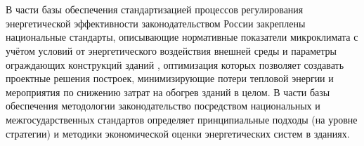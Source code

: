 \section{}


% 


\subsection{\scAssesmentBuildingLaw}
% 
В части базы обеспечения стандартизацией процессов регулирования энергетической эффективности законодательством России закреплены национальные стандарты,
описывающие нормативные показатели микроклимата \cite{law_RU_RulesCode_BuildingMicroclimateResedentialPublic} с учётом условий от энергетического воздействия внешней среды \cite{law_RU_RulesCode_BuildingClimatology}
и параметры ограждающих конструкций зданий \cite{law_RU_Rules_Code_ThermalPerformance,law_RU_Rules_Code_BuildingEnclosingConstruction}, оптимизация которых позволяет создавать проектные решения построек,
минимизирующие потери тепловой энергии и мероприятия по снижению затрат на обогрев зданий в целом.
В части базы обеспечения методологии законодательство посредством национальных и межгосударственных стандартов определяет принципиальные подходы (на уровне стратегии)
и методики экономической оценки энергетических систем в зданиях.


